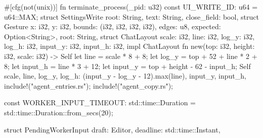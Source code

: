 #[cfg(not(unix))]
fn terminate_process(_pid: u32) {}
const UI_WRITE_ID: u64 = u64::MAX;
struct SettingsWrite {
    root: String,
    text: String,
    close_field: bool,
}
struct Gesture {
    x: i32,
    y: i32,
    bounds: (i32, i32, i32, i32),
    edges: u8,
    expected: Option<String>,
    root: String,
}
struct ChatLayout {
    scale: i32,
    line: i32,
    log_y: i32,
    log_h: i32,
    input_y: i32,
    input_h: i32,
}
impl ChatLayout {
    fn new(top: i32, height: i32, scale: i32) -> Self {
        let line = scale * 8 + 8;
        let log_y = top + 52 + line * 2 + 8;
        let input_h = line * 3 + 12;
        let input_y = top + height - 62 - input_h;
        Self {
            scale,
            line,
            log_y,
            log_h: (input_y - log_y - 12).max(line),
            input_y,
            input_h,
        }
    }
}
include!("agent_entries.rs");
include!("agent_copy.rs");

const WORKER_INPUT_TIMEOUT: std::time::Duration = std::time::Duration::from_secs(20);

struct PendingWorkerInput {
    draft: Editor,
    deadline: std::time::Instant,
}

